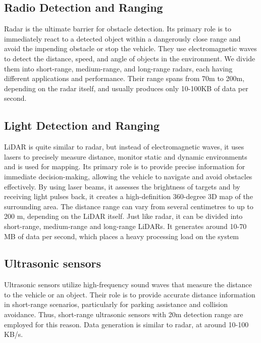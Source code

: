 \documentclass[10pt,oneside,english,a4paper]{article}
\begin{document}
\subsection{Radio Detection and Ranging}
\par Radar is the ultimate barrier for obstacle detection. Its primary role is to immediately react to a detected object within a dangerously close range and avoid the impending obstacle or stop the vehicle. They use electromagnetic waves to detect the distance, speed, and angle of objects in the environment. We divide them into short-range, medium-range, and long-range radars, each having different applications and performance. Their range spans from 70m to 200m, depending on the radar itself, and usually produces only 10-100KB of data per second. 

\subsection{Light Detection and Ranging}
\par LiDAR is quite similar to radar, but instead of electromagnetic waves, it uses lasers to precisely measure distance, monitor static and dynamic environments and is used for mapping. Its primary role is to provide precise information for immediate decision-making, allowing the vehicle to navigate and avoid obstacles effectively. By using laser beams, it assesses the brightness of targets and by receiving light pulses back, it creates a high-definition 360-degree 3D map of the surrounding area. The distance range can vary from several centimetres to up to 200 m, depending on the LiDAR itself. Just like radar, it can be divided into short-range, medium-range and long-range LiDARs. It generates around 10-70 MB of data per second, which places a heavy processing load on the system

\subsection{Ultrasonic sensors}
\par Ultrasonic sensors utilize high-frequency sound waves that measure the distance to the vehicle or an object. Their role is to provide accurate distance information in short-range scenarios, particularly for parking assistance and collision avoidance. Thus, short-range ultrasonic sensors with 20m detection range are employed for this reason. Data generation is similar to radar, at around 10-100 KB/s.
\end{document}
